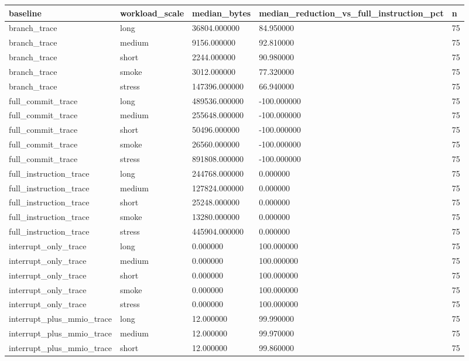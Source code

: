 \begin{tabular}{lllll}
 \hline
baseline & workload\_scale & median\_bytes & median\_reduction\_vs\_full\_instruction\_pct & n \\
 \hline
branch\_trace & long & 36804.000000 & 84.950000 & 75 \\
branch\_trace & medium & 9156.000000 & 92.810000 & 75 \\
branch\_trace & short & 2244.000000 & 90.980000 & 75 \\
branch\_trace & smoke & 3012.000000 & 77.320000 & 75 \\
branch\_trace & stress & 147396.000000 & 66.940000 & 75 \\
full\_commit\_trace & long & 489536.000000 & -100.000000 & 75 \\
full\_commit\_trace & medium & 255648.000000 & -100.000000 & 75 \\
full\_commit\_trace & short & 50496.000000 & -100.000000 & 75 \\
full\_commit\_trace & smoke & 26560.000000 & -100.000000 & 75 \\
full\_commit\_trace & stress & 891808.000000 & -100.000000 & 75 \\
full\_instruction\_trace & long & 244768.000000 & 0.000000 & 75 \\
full\_instruction\_trace & medium & 127824.000000 & 0.000000 & 75 \\
full\_instruction\_trace & short & 25248.000000 & 0.000000 & 75 \\
full\_instruction\_trace & smoke & 13280.000000 & 0.000000 & 75 \\
full\_instruction\_trace & stress & 445904.000000 & 0.000000 & 75 \\
interrupt\_only\_trace & long & 0.000000 & 100.000000 & 75 \\
interrupt\_only\_trace & medium & 0.000000 & 100.000000 & 75 \\
interrupt\_only\_trace & short & 0.000000 & 100.000000 & 75 \\
interrupt\_only\_trace & smoke & 0.000000 & 100.000000 & 75 \\
interrupt\_only\_trace & stress & 0.000000 & 100.000000 & 75 \\
interrupt\_plus\_mmio\_trace & long & 12.000000 & 99.990000 & 75 \\
interrupt\_plus\_mmio\_trace & medium & 12.000000 & 99.970000 & 75 \\
interrupt\_plus\_mmio\_trace & short & 12.000000 & 99.860000 & 75 \\

\end{tabular}
